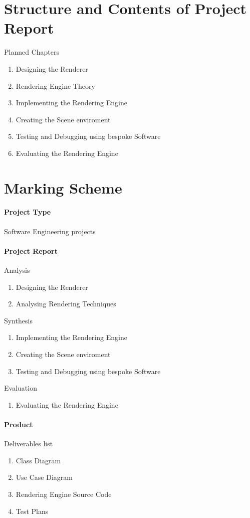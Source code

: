 \section{Structure and Contents of Project Report}
Planned Chapters
\begin{enumerate}
  \item Designing the Renderer
  \item Rendering Engine Theory
  \item Implementing the Rendering Engine
  \item Creating the Scene enviroment
  \item Testing and Debugging using bespoke Software
  \item Evaluating the Rendering Engine
\end{enumerate}

\section{Marking Scheme}
\paragraph{Project Type}Software Engineering projects

\paragraph{Project Report} 
Analysis 
\begin{enumerate}
  \item Designing the Renderer
  \item Analysing Rendering Techniques
\end{enumerate}

Synthesis 
\begin{enumerate}
  \item Implementing the Rendering Engine
  \item Creating the Scene enviroment
  \item Testing and Debugging using bespoke Software
\end{enumerate}

Evaluation
\begin{enumerate}
    \item Evaluating the Rendering Engine
\end{enumerate}


\paragraph{Product}
Deliverables list
\begin{enumerate}
    \item Class Diagram
    \item Use Case Diagram
    \item Rendering Engine Source Code 
    \item Test Plans
\end{enumerate}

